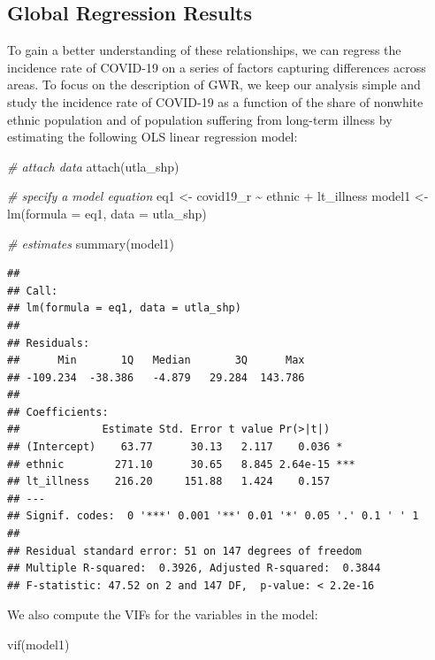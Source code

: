 \documentclass[
]{book}
\newenvironment{Shaded}{\begin{snugshade}}{\end{snugshade}}
\newcommand{\AttributeTok}[1]{\textcolor[rgb]{0.77,0.63,0.00}{#1}}
\newcommand{\CommentTok}[1]{\textcolor[rgb]{0.56,0.35,0.01}{\textit{#1}}}
\newcommand{\FunctionTok}[1]{\textcolor[rgb]{0.00,0.00,0.00}{#1}}
\newcommand{\NormalTok}[1]{#1}
\newcommand{\OtherTok}[1]{\textcolor[rgb]{0.56,0.35,0.01}{#1}}
\newcommand{\SpecialCharTok}[1]{\textcolor[rgb]{0.00,0.00,0.00}{#1}}
\begin{document}
\hypertarget{global-regression-results}{%
\subsection{Global Regression Results}\label{global-regression-results}}

To gain a better understanding of these relationships, we can regress the incidence rate of COVID-19 on a series of factors capturing differences across areas. To focus on the description of GWR, we keep our analysis simple and study the incidence rate of COVID-19 as a function of the share of nonwhite ethnic population and of population suffering from long-term illness by estimating the following OLS linear regression model:

\begin{Shaded}
\begin{Highlighting}[]
\CommentTok{\# attach data}
\FunctionTok{attach}\NormalTok{(utla\_shp)}

\CommentTok{\# specify a model equation}
\NormalTok{eq1 }\OtherTok{\textless{}{-}}\NormalTok{ covid19\_r }\SpecialCharTok{\textasciitilde{}}\NormalTok{ ethnic }\SpecialCharTok{+}\NormalTok{ lt\_illness}
\NormalTok{model1 }\OtherTok{\textless{}{-}} \FunctionTok{lm}\NormalTok{(}\AttributeTok{formula =}\NormalTok{ eq1, }\AttributeTok{data =}\NormalTok{ utla\_shp)}

\CommentTok{\# estimates}
\FunctionTok{summary}\NormalTok{(model1)}
\end{Highlighting}
\end{Shaded}

\begin{verbatim}
## 
## Call:
## lm(formula = eq1, data = utla_shp)
## 
## Residuals:
##      Min       1Q   Median       3Q      Max 
## -109.234  -38.386   -4.879   29.284  143.786 
## 
## Coefficients:
##             Estimate Std. Error t value Pr(>|t|)    
## (Intercept)    63.77      30.13   2.117    0.036 *  
## ethnic        271.10      30.65   8.845 2.64e-15 ***
## lt_illness    216.20     151.88   1.424    0.157    
## ---
## Signif. codes:  0 '***' 0.001 '**' 0.01 '*' 0.05 '.' 0.1 ' ' 1
## 
## Residual standard error: 51 on 147 degrees of freedom
## Multiple R-squared:  0.3926, Adjusted R-squared:  0.3844 
## F-statistic: 47.52 on 2 and 147 DF,  p-value: < 2.2e-16
\end{verbatim}

We also compute the VIFs for the variables in the model:

\begin{Shaded}
\begin{Highlighting}[]
\FunctionTok{vif}\NormalTok{(model1)}
\end{Highlighting}
\end{Shaded}
\end{document}
